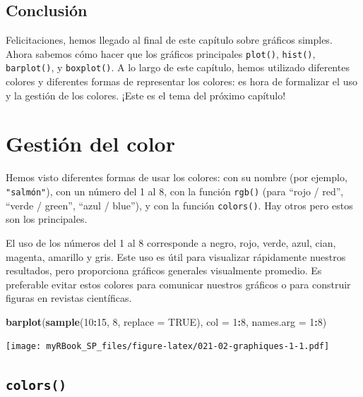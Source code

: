 \documentclass[
]{book}
\newenvironment{Shaded}{\begin{snugshade}}{\end{snugshade}}
\newcommand{\DataTypeTok}[1]{\textcolor[rgb]{0.13,0.29,0.53}{#1}}
\newcommand{\DecValTok}[1]{\textcolor[rgb]{0.00,0.00,0.81}{#1}}
\newcommand{\KeywordTok}[1]{\textcolor[rgb]{0.13,0.29,0.53}{\textbf{#1}}}
\newcommand{\NormalTok}[1]{#1}
\newcommand{\OperatorTok}[1]{\textcolor[rgb]{0.81,0.36,0.00}{\textbf{#1}}}
\newcommand{\OtherTok}[1]{\textcolor[rgb]{0.56,0.35,0.01}{#1}}
\begin{document}
\hypertarget{conclusiuxf3n-8}{%
\section{Conclusión}\label{conclusiuxf3n-8}}

Felicitaciones, hemos llegado al final de este capítulo sobre gráficos simples. Ahora sabemos cómo hacer que los gráficos principales \texttt{plot()}, \texttt{hist()}, \texttt{barplot()}, y \texttt{boxplot()}. A lo largo de este capítulo, hemos utilizado diferentes colores y diferentes formas de representar los colores: es hora de formalizar el uso y la gestión de los colores. ¡Este es el tema del próximo capítulo!

\hypertarget{graph2}{%
\chapter{Gestión del color}\label{graph2}}

Hemos visto diferentes formas de usar los colores: con su nombre (por ejemplo, \texttt{"salmón"}), con un número del 1 al 8, con la función \texttt{rgb()} (para ``rojo / red'', ``verde / green'', ``azul / blue''), y con la función \texttt{colors()}. Hay otros pero estos son los principales.

El uso de los números del 1 al 8 corresponde a negro, rojo, verde, azul, cian, magenta, amarillo y gris. Este uso es útil para visualizar rápidamente nuestros resultados, pero proporciona gráficos generales visualmente promedio. Es preferable evitar estos colores para comunicar nuestros gráficos o para construir figuras en revistas científicas.

\begin{Shaded}
\begin{Highlighting}[]
\KeywordTok{barplot}\NormalTok{(}\KeywordTok{sample}\NormalTok{(}\DecValTok{10}\OperatorTok{:}\DecValTok{15}\NormalTok{, }\DecValTok{8}\NormalTok{, }\DataTypeTok{replace =} \OtherTok{TRUE}\NormalTok{), }\DataTypeTok{col =} \DecValTok{1}\OperatorTok{:}\DecValTok{8}\NormalTok{, }\DataTypeTok{names.arg =} \DecValTok{1}\OperatorTok{:}\DecValTok{8}\NormalTok{)}
\end{Highlighting}
\end{Shaded}

\texttt{[image: myRBook\_SP\_files/figure-latex/021-02-graphiques-1-1.pdf]}

\hypertarget{colors}{%
\section{\texorpdfstring{\texttt{colors()}}{colors()}}\label{colors}}
\end{document}
